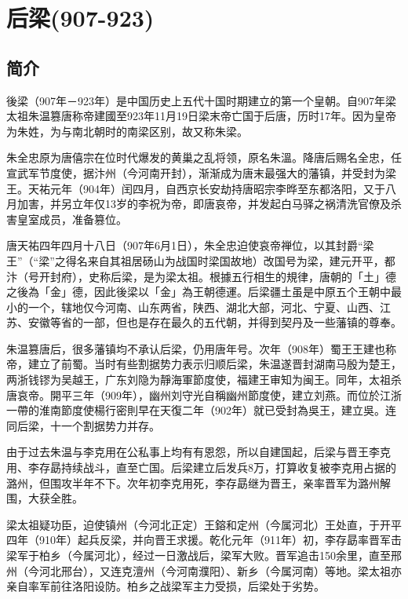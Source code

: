 

\section{后梁\tiny(907-923)}

\subsection{简介}

後梁（907年－923年）是中国历史上五代十国时期建立的第一个皇朝。自907年梁太祖朱温篡唐称帝建國至923年11月19日梁末帝亡国于后唐，历时17年。因为皇帝为朱姓，为与南北朝时的南梁区别，故又称朱梁。

朱全忠原为唐僖宗在位时代爆发的黄巢之乱将领，原名朱溫。降唐后赐名全忠，任宣武军节度使，据汴州（今河南开封），渐渐成为唐末最强大的藩镇，并受封为梁王。天祐元年（904年）闰四月，自西京长安劫持唐昭宗李晔至东都洛阳，又于八月加害，并另立年仅13岁的李祝为帝，即唐哀帝，并发起白马驿之祸清洗官僚及杀害皇室成员，准备篡位。

唐天祐四年四月十八日（907年6月1日），朱全忠迫使哀帝禅位，以其封爵“梁王”（“梁”之得名来自其祖居砀山为战国时梁国故地）改国号为梁，建元开平，都汴（号开封府），史称后梁，是为梁太祖。根據五行相生的規律，唐朝的「土」德之後為「金」德，因此後梁以「金」為王朝德運。后梁疆土虽是中原五个王朝中最小的一个，辖地仅今河南、山东两省，陕西、湖北大部，河北、宁夏、山西、江苏、安徽等省的一部，但也是存在最久的五代朝，并得到契丹及一些藩镇的尊奉。

朱温篡唐后，很多藩镇均不承认后梁，仍用唐年号。次年（908年）蜀王王建也称帝，建立了前蜀。当时有些割据势力表示归顺后梁，朱温遂晋封湖南马殷为楚王，两浙钱镠为吴越王，广东刘隐为靜海軍節度使，福建王审知为闽王。同年，太祖杀唐哀帝。開平三年（909年），幽州刘守光自稱幽州節度使，建立刘燕。而位於江浙一帶的淮南節度使楊行密則早在天復二年（902年）就已受封為吳王，建立吳。连同后梁，十一个割据势力并存。

由于过去朱温与李克用在公私事上均有有恩怨，所以自建国起，后梁与晋王李克用、李存勗持续战斗，直至亡国。后梁建立后发兵8万，打算收复被李克用占据的潞州，但围攻半年不下。次年初李克用死，李存勗继为晋王，亲率晋军为潞州解围，大获全胜。

梁太祖疑功臣，迫使镇州（今河北正定）王鎔和定州（今属河北）王处直，于开平四年（910年）起兵反梁，并向晋王求援。乾化元年（911年）初，李存勗率晋军击梁军于柏乡（今属河北），经过一日激战后，梁军大败。晋军追击150余里，直至邢州（今河北邢台），又连克澶州（今河南濮阳）、新乡（今属河南）等地。梁太祖亦亲自率军前往洛阳设防。柏乡之战梁军主力受损，后梁处于劣势。

